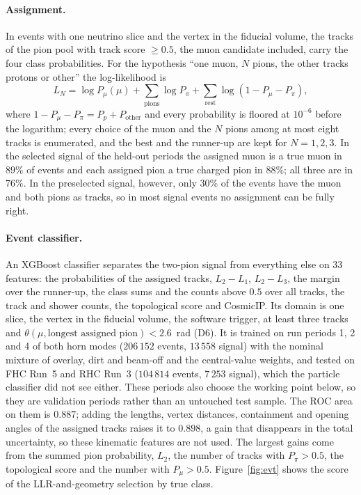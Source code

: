 \documentclass[11pt,a4paper]{article}
\begin{document}
\paragraph{Assignment.} In events with one neutrino slice and the vertex in the fiducial volume, the
tracks of the pion pool with track score $\geq0.5$, the muon candidate included, carry the four class
probabilities. For the hypothesis ``one muon, $N$ pions, the other tracks protons or other'' the
log-likelihood is
\begin{equation}
  L_N = \log P_\mu(\mu) + \sum_{\text{pions}}\log P_\pi + \sum_{\text{rest}}\log\left(1-P_\mu-P_\pi\right),
\end{equation}
where $1-P_\mu-P_\pi=P_p+P_\mathrm{other}$ and every probability is floored at $10^{-6}$ before the
logarithm; every choice of the muon and the $N$ pions among at most eight tracks is enumerated, and the
best and the runner-up are kept for $N=1,2,3$. In the selected signal of the held-out periods the
assigned muon is a true muon in $89\%$ of events and each assigned pion a true charged pion in $88\%$;
all three are in $76\%$. In the preselected signal, however, only $30\%$ of the events have the muon
and both pions as tracks, so in most signal events no assignment can be fully right.

\paragraph{Event classifier.} An XGBoost classifier separates the two-pion signal from everything else
on 33 features: the probabilities of the assigned tracks, $L_2-L_1$, $L_2-L_3$, the margin over the
runner-up, the class sums and the counts above $0.5$ over all tracks, the track and shower counts, the
topological score and CosmicIP. Its domain is one slice, the vertex in the fiducial volume, the software
trigger, at least three tracks and $\theta(\mu,\text{longest assigned pion})<2.6$~rad (D6). It is trained
on run periods 1, 2 and 4 of both horn modes ($206\,152$ events, $13\,558$ signal) with the nominal
mixture of overlay, dirt and beam-off and the central-value weights, and tested on FHC Run~5 and RHC
Run~3 ($104\,814$ events, $7\,253$ signal), which the particle classifier did not see either. These periods also
choose the working point below, so they are validation periods rather than an untouched test sample. The
ROC area on them is $0.887$; adding the lengths, vertex distances, containment and opening
angles of the assigned tracks raises it to $0.898$, a gain that disappears in the total uncertainty, so
these kinematic features are not used. The largest gains come from the summed pion probability, $L_2$,
the number of tracks with $P_\pi>0.5$, the topological score and the number with $P_\mu>0.5$.
Figure~\ref{fig:evt} shows the score of the LLR-and-geometry selection by true class.
\end{document}
